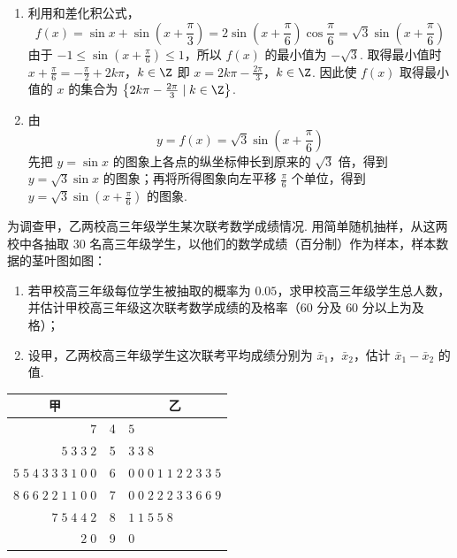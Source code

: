 \begin{solution}
\begin{enumerate}
\item 利用和差化积公式，
\[
f(x)=\sin x+\sin\left(x+\frac\pi3\right)
=2\sin\left(x+\frac\pi6\right)\cos\frac\pi6
=\sqrt3\sin\left(x+\frac\pi6\right)
\]
由于 \(-1\leqslant\sin\left(x+\frac\pi6\right)\leqslant1\)，所以 \(f(x)\) 的最小值为 \(-\sqrt3\). 取得最小值时
\(x+\frac\pi6=-\frac\pi2+2k\pi\)，\(k\in\Z\)
即
\(x=2k\pi-\frac{2\pi}{3}\)，\(k\in\Z\).
因此使 \(f(x)\) 取得最小值的 \(x\) 的集合为 \(\left\{2k\pi-\frac{2\pi}{3}\mid k\in\Z\right\}\).

\item 由
\[
y=f(x)=\sqrt3\sin\left(x+\frac\pi6\right)
\]
先把 \(y=\sin x\) 的图象上各点的纵坐标伸长到原来的 \(\sqrt3\) 倍，得到 \(y=\sqrt3\sin x\) 的图象；再将所得图象向左平移 \(\frac\pi6\) 个单位，得到 \(y=\sqrt3\sin\left(x+\frac\pi6\right)\) 的图象.
\end{enumerate}
\end{solution}

\begin{problem}
为调查甲，乙两校高三年级学生某次联考数学成绩情况. 用简单随机抽样，从这两校中各抽取 \(30\) 名高三年级学生，以他们的数学成绩（百分制）作为样本，样本数据的茎叶图如图：

\begin{enumerate}
\item 若甲校高三年级每位学生被抽取的概率为 \(0.05\)，求甲校高三年级学生总人数，并估计甲校高三年级这次联考数学成绩的及格率（\(60\) 分及 \(60\) 分以上为及格）；
\item 设甲，乙两校高三年级学生这次联考平均成绩分别为 \(\bar{x}_{1}\)，\(\bar{x}_{2}\)，估计 \( \bar{x}_{1} - \bar{x}_{2} \) 的值.
\end{enumerate}

\begin{center}
\begin{tabular}{r|c|l}
\multicolumn{1}{c}{甲} & \  & \multicolumn{1}{c}{乙} \\
\hline
\(7\) & 4 & \(5\) \\
\(5\;3\;3\;2\) & 5 & \(3\;3\;8\) \\
\(5\;5\;4\;3\;3\;3\;1\;0\;0\) & 6 & \(0\;0\;0\;1\;1\;2\;2\;3\;3\;5\) \\
\(8\;6\;6\;2\;2\;1\;1\;0\;0\) & 7 & \(0\;0\;2\;2\;2\;3\;3\;6\;6\;9\) \\
\(7\;5\;4\;4\;2\) & 8 & \(1\;1\;5\;5\;8\) \\
\(2\;0\) & 9 & \(0\)
\end{tabular}
\end{center}
\end{problem}

